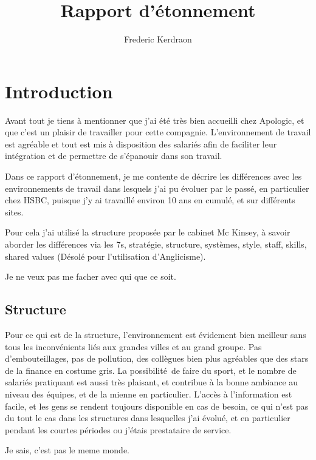 \documentclass[11pt]{article} %
\title{Rapport d'étonnement}
\author{Frederic Kerdraon}
\begin{document}
\maketitle

\section{Introduction}

Avant tout je tiens à mentionner que j’ai été très bien accueilli chez Apologic, et que c’est un plaisir de travailler pour cette compagnie. L’environnement de travail est agréable et tout est mis à disposition des salariés afin de faciliter leur intégration et de permettre de s’épanouir dans son travail.

Dans ce rapport d’étonnement, je me contente de décrire les différences avec les environnements de travail dans lesquels j’ai pu évoluer par le passé, en particulier chez HSBC, puisque j’y ai travaillé environ 10 ans en cumulé, et sur différents sites.

Pour cela j’ai utilisé la structure proposée par le cabinet Mc Kinsey, à savoir aborder les différences via les 7s, stratégie, structure, systèmes, style, staff, skills, shared values (Désolé pour l’utilisation d’Anglicisme).

Je ne veux pas me facher avec qui que ce soit.

\subsection{Structure}

Pour ce qui est de la structure, l’environnement est évidement bien meilleur sans tous les inconvénients liés aux grandes villes et au grand groupe. Pas d’embouteillages, pas de pollution, des collègues bien plus agréables que des stars de la finance en costume gris. La possibilité de faire du sport, et le nombre de salariés pratiquant est aussi très plaisant, et contribue à la bonne ambiance au niveau des équipes, et de la mienne en particulier. 
L’accès à l’information est facile, et les gens se rendent toujours disponible en cas de besoin, ce qui n’est pas du tout le cas dans les structures dans lesquelles j’ai évolué, et en particulier pendant les courtes périodes ou j’étais prestataire de service.

Je sais, c'est pas le meme monde.
\end{document}
